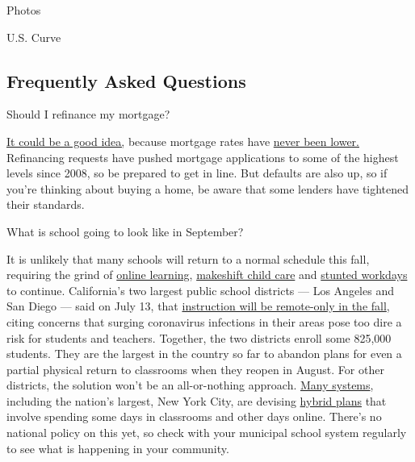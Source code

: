 Photos

U.S. Curve

\hypertarget{frequently-asked-questions}{%
\subsection{Frequently Asked
Questions}\label{frequently-asked-questions}}

 Should I refinance my mortgage?

\href{https://www.nytimes3xbfgragh.onion/article/coronavirus-money-unemployment.html}{It
could be a good idea,} because mortgage rates have
\href{https://www.nytimes3xbfgragh.onion/2020/07/16/business/mortgage-rates-below-3-percent.html}{never
been lower.} Refinancing requests have pushed mortgage applications to
some of the highest levels since 2008, so be prepared to get in line.
But defaults are also up, so if you're thinking about buying a home, be
aware that some lenders have tightened their standards.

 What is school going to look like in September?

It is unlikely that many schools will return to a normal schedule this
fall, requiring the grind of
\href{https://www.nytimes3xbfgragh.onion/2020/06/05/us/coronavirus-education-lost-learning.html}{online
learning},
\href{https://www.nytimes3xbfgragh.onion/2020/05/29/us/coronavirus-child-care-centers.html}{makeshift
child care} and
\href{https://www.nytimes3xbfgragh.onion/2020/06/03/business/economy/coronavirus-working-women.html}{stunted
workdays} to continue. California's two largest public school districts
--- Los Angeles and San Diego --- said on July 13, that
\href{https://www.nytimes3xbfgragh.onion/2020/07/13/us/lausd-san-diego-school-reopening.html}{instruction
will be remote-only in the fall}, citing concerns that surging
coronavirus infections in their areas pose too dire a risk for students
and teachers. Together, the two districts enroll some 825,000 students.
They are the largest in the country so far to abandon plans for even a
partial physical return to classrooms when they reopen in August. For
other districts, the solution won't be an all-or-nothing approach.
\href{https://bioethics.jhu.edu/research-and-outreach/projects/eschool-initiative/school-policy-tracker/}{Many
systems}, including the nation's largest, New York City, are devising
\href{https://www.nytimes3xbfgragh.onion/2020/06/26/us/coronavirus-schools-reopen-fall.html}{hybrid
plans} that involve spending some days in classrooms and other days
online. There's no national policy on this yet, so check with your
municipal school system regularly to see what is happening in your
community.

